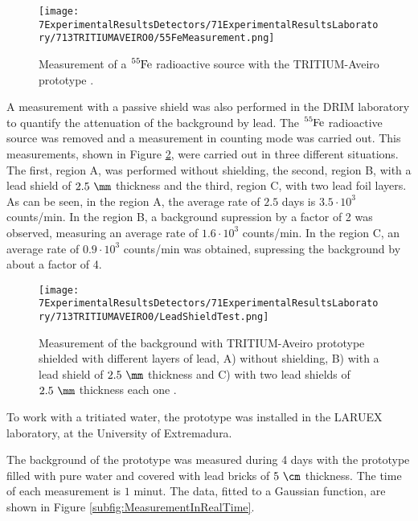 \begin{figure}[h]
\centering
\texttt{[image: 7ExperimentalResultsDetectors/71ExperimentalResultsLaboratory/713TRITIUMAVEIRO0/55FeMeasurement.png]}
\caption{Measurement of a $\ce{^{55}Fe}$ radioactive source with the TRITIUM-Aveiro prototype \cite{ExperimentalPaperCarlos}.\label{fig:55FeMeasurement}}
\end{figure}

A measurement with a passive shield was also performed in the DRIM laboratory to quantify the attenuation of the background by lead. The $\ce{^{55}Fe}$ radioactive source was removed and a measurement in counting mode was carried out. This measurements, shown in Figure \ref{fig:LeadShieldTest}, were carried out in three different situations. The first, region A, was performed without shielding, the second, region B, with a lead shield of $2.5~\mm$ thickness and the third, region C, with two lead foil layers. As can be seen, in the region A, the average rate of $2.5$ days is $3.5 \cdot{} 10^3$ counts/min. In the region B, a background supression by a factor of 2 was observed, measuring an average rate of $1.6 \cdot{} 10^3$ counts/min. In the region C, an average rate of $0.9 \cdot{} 10^3$ counts/min was obtained, supressing the background by about a factor of 4.

\begin{figure}[h]
\centering
\texttt{[image: 7ExperimentalResultsDetectors/71ExperimentalResultsLaboratory/713TRITIUMAVEIRO0/LeadShieldTest.png]}
\caption{Measurement of the background with TRITIUM-Aveiro prototype shielded with different layers of lead, A) without shielding, B) with a lead shield of $2.5~\mm$ thickness and C) with two lead shields of $2.5~\mm$ thickness each one \cite{ExperimentalPaperCarlos}.\label{fig:LeadShieldTest}}
\end{figure}


To work with a tritiated water, the prototype was installed in the LARUEX laboratory, at the University of Extremadura. 

The background of the prototype was measured during 4 days with the prototype filled with pure water and covered with lead bricks of $5~\cm$ thickness. The time of each measurement is $1$ minut. The data, fitted to a Gaussian function, are shown in Figure \ref{subfig:MeasurementInRealTime}. 

